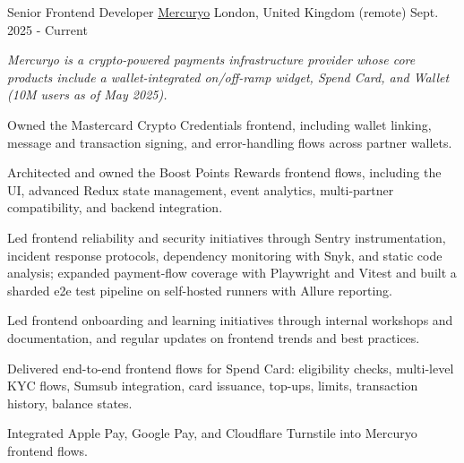 

\begin{cventries}

  \cventry
    {Senior Frontend Developer} %
    {\href{https://mercuryo.io/}{Mercuryo}} %
    {London, United Kingdom (remote)} %
    {Sept. 2025 - Current} %
    {
      \begin{cvitems} %
      \vspace{8pt}
      \item[] {\small\textit{Mercuryo is a crypto-powered payments infrastructure provider whose core products include a wallet-integrated on/off-ramp widget, Spend Card, and Wallet (10M users as of May 2025).}}
      \vspace{8pt}
        \item {Owned the Mastercard Crypto Credentials frontend, including wallet linking, message and transaction signing, and error-handling flows across partner wallets.}
        \item {Architected and owned the Boost Points Rewards frontend flows, including the UI, advanced Redux state management, event analytics, multi-partner compatibility, and backend integration.}
        \item {Led frontend reliability and security initiatives through Sentry instrumentation, incident response protocols, dependency monitoring with Snyk, and static code analysis; expanded payment-flow coverage with Playwright and Vitest and built a sharded e2e test pipeline on self-hosted runners with Allure reporting.}
        \item {Led frontend onboarding and learning initiatives through internal workshops and documentation, and regular updates on frontend trends and best practices.}
        \item {Delivered end-to-end frontend flows for Spend Card: eligibility checks, multi-level KYC flows, Sumsub integration, card issuance, top-ups, limits, transaction history, balance states.}
        \item {Integrated Apple Pay, Google Pay, and Cloudflare Turnstile into Mercuryo frontend flows.}

\end{cvitems}}
\end{cventries}
